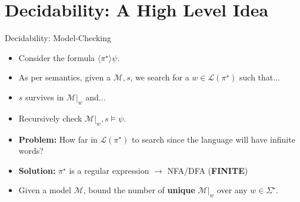 \documentclass[usenames,dvipsnames]{beamer}
\newcommand\ldiaarg[1]{\langle#1\rangle}
\newcommand{\M}{\mathcal{M}}
\newcommand{\LL}{\mathcal{L}} %
\newcommand{\regdiv}[1]{\ensuremath{\backslash} #1}
\begin{document}
\section{Decidability: A High Level Idea}
    \begin{frame}{Decidability: Model-Checking}
        \begin{itemize}
        \setlength\itemsep{1em}
            \item<1-> Consider the formula $\ldiaarg{\pi^\star}\psi$.
            \item<2-> As per semantics, given a $\M,s$, we search for a $w\in\LL(\pi^\star)$ such that...

            \item<3-> $s$ survives in $\M|_w$ and...

            \item<4-> Recursively check $\M|_w,s\vDash\psi$.

            \item<5-> \textbf{Problem:} How far in $\LL(\pi^\star)$ to search since the language will have infinite words?

            \item<6-> \textbf{Solution:} $\pi^\star$ is a regular expression $\longrightarrow$ NFA/DFA (\textbf{FINITE})

            \item<7-> Given a model $\M$, bound the number of \textbf{unique} $\M|_w$ over any $w\in \Sigma^\star$.
        \end{itemize}
    \end{frame}


             
\end{document}
